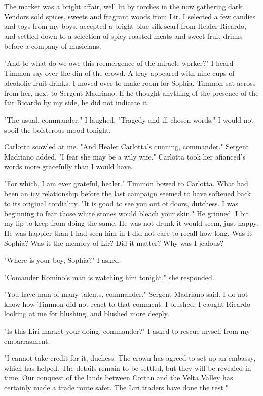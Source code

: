 \documentclass{article}
\begin{document}
The market was a bright affair, well lit by torches in the now gathering dark. Vendors sold spices, sweets and fragrant woods from Lir. I selected a few candies and toys from my boys, accepted a bright blue silk scarf from Healer Ricardo, and settled down to a selection of spicy roasted meats and sweet fruit drinks before a company of musicians. 

"And to what do we owe this reemergence of the miracle worker?" I heard Timmon say over the din of the crowd. A tray appeared with nine cups of alcoholic fruit drinks. I moved over to make room for Sophia. Timmon sat across from her, next to Sergent Madriano. If he thought anything of the presence of the fair Ricardo by my side, he did not indicate it.

"The usual, commander." I laughed. "Tragedy and ill chosen words." I would not spoil the boisterous mood tonight.

Carlotta scowled at me. "And Healer Carlotta's cunning, commander." Sergent Madriano added. "I fear she may be a wily wife." Carlotta took her afianced's words more gracefully than I would have.

"For which, I am ever grateful, healer." Timmon bowed to Carlotta. What had been an icy relationship before the last campaign seemed to have softened back to its original cordiality. "It is good to see you out of doors, dutchess. I was beginning to fear those white stones would bleach your skin." He grinned. I bit my lip to keep from doing the same. He was not drunk it would seem, just happy. He was happier than I had seen him in I did not care to recall how long. Was it Sophia? Was it the memory of Lir? Did it matter? Why was I jealous?

"Where is your boy, Sophia?" I asked.

"Comander Romino's man is watching him tonight," she responded.

"You have man of many talents, commander." Sergent Madriano said. I do not know how Timmon did not react to that comment. I blushed. I caught Ricardo looking at me for blushing, and blushed more deeply. 

"Is this Liri market your doing, commander?" I asked to rescue myself from my embarrasment.

"I cannot take credit for it, duchess. The crown has agreed to set up an embassy, which has helped. The details remain to be settled, but they will be revealed in time. Our conquest of the lands between Cortan and the Velta Valley has certainly made a trade route safer. The Liri traders have done the rest." 
\end{document}
